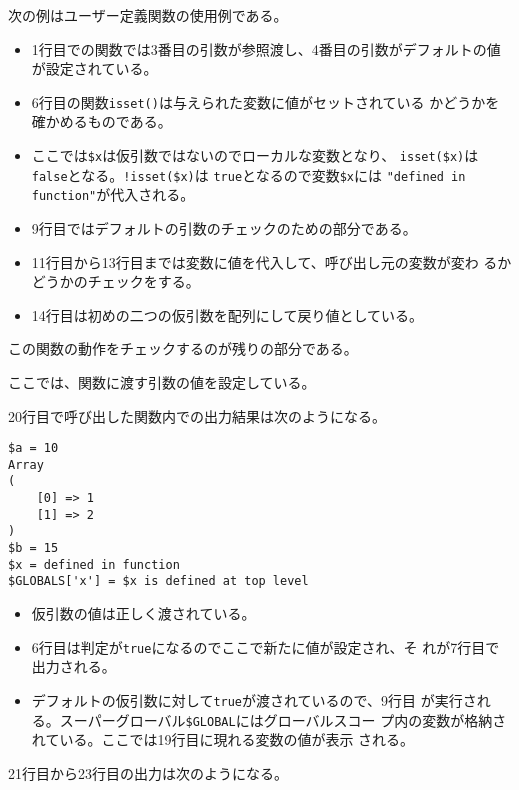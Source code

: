 \begin{Exec}\upshape
 次の例はユーザー定義関数の使用例である。
\begin{itemize}
 \item 1行目での関数では3番目の引数が参照渡し、4番目の引数がデフォルトの値
       が設定されている。 
 \item 6行目の関数\texttt{isset()}は与えられた変数に値がセットされている
       かどうかを確かめるものである。
 \item ここでは\Verb+$x+は仮引数ではないのでローカルな変数となり、
       \Verb+isset($x)+は\texttt{false}となる。\Verb+!isset($x)+は
       \texttt{true}となるので変数\Verb+$x+には
       \Verb+"defined in function"+が代入される。
 \item 9行目ではデフォルトの引数のチェックのための部分である。
 \item 11行目から13行目までは変数に値を代入して、呼び出し元の変数が変わ
       るかどうかのチェックをする。
 \item 14行目は初めの二つの仮引数を配列にして戻り値としている。
\end{itemize}
この関数の動作をチェックするのが残りの部分である。
 \iffalse
 \begin{listingcont}
$a = 10;
$as = array(1,2);
$b = 15;
$x = "\$x is defined at top level";
 \end{listingcont}
 \fi
 ここでは、関数に渡す引数の値を設定している。
 \iffalse
 \begin{listingcont}
example($a, $as, $b, true);
print "\$a = $a\n";
print_r($as);  
print "\$b = $b\n";
 \end{listingcont}
\fi
20行目で呼び出した関数内での出力結果は次のようになる。
\begin{Verbatim}
$a = 10
Array
(
    [0] => 1
    [1] => 2
)
$b = 15
$x = defined in function
$GLOBALS['x'] = $x is defined at top level
\end{Verbatim}
\begin{itemize}
 \item 仮引数の値は正しく渡されている。
 \item 6行目は判定が\texttt{true}になるのでここで新たに値が設定され、そ
       れが7行目で出力される。
 \item デフォルトの仮引数に対して\texttt{true}が渡されているので、9行目
       が実行される。スーパーグローバル\Verb+$GLOBAL+にはグローバルスコー
       プ内の変数が格納されている。ここでは19行目に現れる変数の値が表示
       される。
\end{itemize}
21行目から23行目の出力は次のようになる。

\end{Exec}
